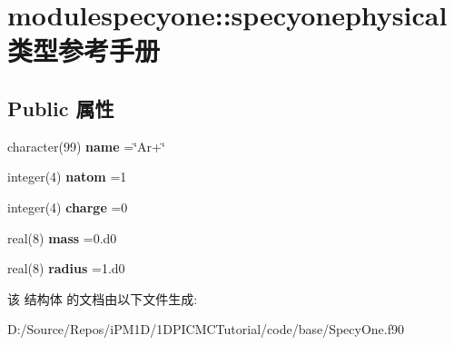 \hypertarget{structmodulespecyone_1_1specyonephysical}{}\section{modulespecyone\+::specyonephysical 类型参考手册}
\label{structmodulespecyone_1_1specyonephysical}
\subsection*{Public 属性}
\begin{DoxyCompactItemize}
\item 
\mbox{\label{structmodulespecyone_1_1specyonephysical_a424823bcb72f6dce4e259c99d46fe969}} 
character(99) {\bfseries name} =\char`\"{}Ar+\char`\"{}
\item 
\mbox{\label{structmodulespecyone_1_1specyonephysical_a2d0843d08f436ec476cac18740ed5bb6}} 
integer(4) {\bfseries natom} =1
\item 
\mbox{\label{structmodulespecyone_1_1specyonephysical_ad50ea085c2a8555992bf194ed81bb4b6}} 
integer(4) {\bfseries charge} =0
\item 
\mbox{\label{structmodulespecyone_1_1specyonephysical_a1aaa80938f4f7ff5fcd9bd355a8f2ac1}} 
real(8) {\bfseries mass} =0.d0
\item 
\mbox{\label{structmodulespecyone_1_1specyonephysical_a86d359a71a11f7cac0b085984d891b93}} 
real(8) {\bfseries radius} =1.d0
\end{DoxyCompactItemize}


该 结构体 的文档由以下文件生成\+:\begin{DoxyCompactItemize}
\item 
D\+:/\+Source/\+Repos/i\+P\+M1\+D/1\+D\+P\+I\+C\+M\+C\+Tutorial/code/base/Specy\+One.\+f90\end{DoxyCompactItemize}
